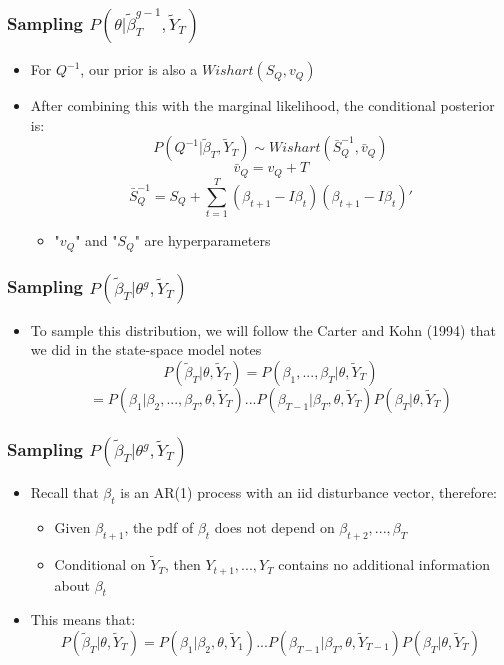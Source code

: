 \scshape\documentclass[xcolor=svgnames]{beamer}
\begin{document}
\begin{frame}
\frametitle{Sampling $P(\theta|\tilde{\beta}_T^{g-1},\tilde{Y}_T)$}
\begin{itemize}
	\item  For $Q^{-1}$, our prior is also a $Wishart(S_Q,v_Q)$
	\item  After combining this with the marginal likelihood, the conditional posterior is:
	\vspace{0.1 in}
		$$P(Q^{-1}|\tilde{\beta}_T,\tilde{Y}_T) \sim Wishart(\bar{S}_Q^{-1},\bar{v}_Q)$$ 
			$$\bar{v}_Q = v_Q + T$$
			$$\bar{S}_Q^{-1} = S_Q + \sum\limits_{t=1}^{T} (\beta_{t+1}-I\beta_t)(\beta_{t+1}-I\beta_t)'$$
	\begin{itemize}
		\item "$v_Q$" and "$S_Q$" are hyperparameters
	\end{itemize}
\end{itemize}
\end{frame}

\begin{frame}
\frametitle{Sampling $P(\tilde{\beta}_T|\theta^g,\tilde{Y}_T)$}
\begin{itemize}
	\item  To sample this distribution, we will follow the Carter and Kohn (1994) that we did in the state-space model notes
	\vspace{0.1 in}
	$$ P(\tilde{\beta}_T|\theta,\tilde{Y}_T) = P(\beta_1,...,\beta_T|\theta,\tilde{Y}_T) $$
	$$ = P(\beta_1|\beta_2,...,\beta_T,\theta,\tilde{Y}_T) ... P(\beta_{T-1}|\beta_T,\theta,\tilde{Y}_T)P(\beta_T|\theta,\tilde{Y}_T) $$
\end{itemize}
\end{frame}

\begin{frame}
\frametitle{Sampling $P(\tilde{\beta}_T|\theta^g,\tilde{Y}_T)$}
\begin{itemize}
	\item  Recall that $\beta_t$ is an AR(1) process with an iid disturbance vector, therefore:
	\begin{itemize}
		\item  Given $\beta_{t+1}$, the pdf of $\beta_t$ does not depend on $\beta_{t+2},...,\beta_T$
		\item  Conditional on $\tilde{Y}_T$, then $Y_{t+1},...,Y_T$ contains no additional information about $\beta_t$
	\end{itemize}
	\vspace{0.1 in}
	\item This means that:
	$$P(\tilde{\beta}_T|\theta,\tilde{Y}_T)=P(\beta_1|\beta_2,\theta,\tilde{Y}_1)...P(\beta_{T-1}|\beta_T,\theta,\tilde{Y}_{T-1})P(\beta_T|\theta,\tilde{Y}_T)$$
\end{itemize}
\end{frame}
\end{document}
